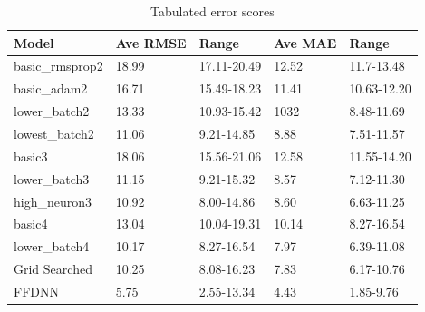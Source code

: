 ﻿\documentclass[10pt,11pt,12pt,oneside]{book}
\begin{document}
\begin{table}[H]
\centering
\begin{tabular}{|l|l|l|l|l|}
\toprule
Model & Ave RMSE & Range & Ave MAE & Range \\
\hline
basic\_rmsprop2  & 18.99 & 17.11-20.49 & 12.52 & 11.7-13.48 \\
\hline
basic\_adam2  & 16.71 & 15.49-18.23 & 11.41 & 10.63-12.20 \\
\hline
lower\_batch2 & 13.33 & 10.93-15.42 & 1032 & 8.48-11.69  \\
\hline
lowest\_batch2 & 11.06 & 9.21-14.85 & 8.88 & 7.51-11.57 \\
\hline
basic3 & 18.06 & 15.56-21.06 & 12.58 & 11.55-14.20 \\
\hline
lower\_batch3 & 11.15 & 9.21-15.32 & 8.57 & 7.12-11.30 \\
\hline
high\_neuron3 & 10.92 & 8.00-14.86 & 8.60 & 6.63-11.25 \\
\hline
basic4 & 13.04 & 10.04-19.31 & 10.14 & 8.27-16.54 \\
\hline
lower\_batch4 & 10.17 & 8.27-16.54 & 7.97 & 6.39-11.08 \\
\hline
Grid Searched & 10.25 & 8.08-16.23 & 7.83 & 6.17-10.76 \\
\hline
FFDNN & 5.75 & 2.55-13.34 & 4.43 & 1.85-9.76 \\
\bottomrule
\end{tabular}
\caption{Tabulated error scores}
\label{table:results}
\end{table}
\end{document}
